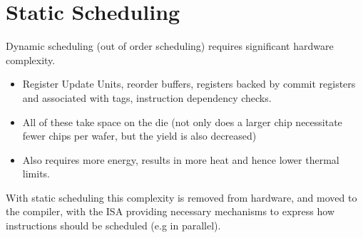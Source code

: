 \chapter{Static Scheduling}

Dynamic scheduling (out of order scheduling) requires significant hardware complexity.
\begin{itemize}
    \item Register Update Units, reorder buffers, registers backed by commit registers and associated with tags, instruction dependency checks.
    \item All of these take space on the die (not only does a larger chip necessitate fewer chips per wafer, but the yield is also decreased)
    \item Also requires more energy, results in more heat and hence lower thermal limits.
\end{itemize}
With static scheduling this complexity is removed from hardware, and moved to the compiler, with the ISA providing necessary mechanisms to express how instructions should be scheduled (e.g in parallel).

